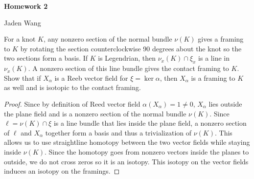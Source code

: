 \documentclass[12pt]{article}
\begin{document}
\centerline {\textsf{\textbf{\LARGE{Homework 2}}}}
\centerline {Jaden Wang}
\vspace{.15in}

\begin{problem}[1]
For a knot $ K$,  any nonzero section of the normal bundle $ \nu(K)$ gives a framing to $ K$ by rotating the section counterclockwise 90 degrees about the knot so the two sections form a basis. If $ K$ is  Legendrian, then $ \nu_x(K) \cap \xi_x$ is a line in $ \nu_x(K)$. A nonzero section of this line bundle gives the contact framing to $ K$. Show that if $ X_{ \alpha}$ is a Reeb vector field for $ \xi = \ker \alpha$, then $ X_{ \alpha}$ is a framing to $ K$ as well and is isotopic to the contact framing. 

\begin{proof}
Since by definition of Reed vector field $ \alpha(X_{ \alpha}) = 1 \neq 0$, $ X_{ \alpha}$ lies outside the plane field and is a nonzero section of the normal bundle $ \nu(K)$. Since $\ell = \nu(K) \cap \xi$ is a line bundle that lies inside the plane field, a nonzero section of $ \ell$ and $ X_{ \alpha}$ together form a basis and thus a trivialization of $ \nu(K)$. This allows us to use straightline homotopy between the two vector fields while staying inside $ \nu(K)$. Since the homotopy goes from nonzero vectors inside the planes to outside, we do not cross zeros so it is an isotopy. This isotopy on the vector fields induces an isotopy on the framings.
\end{proof}
\end{problem}
\end{document}
